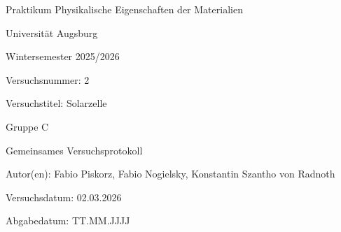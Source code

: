 \documentclass[11pt,a4paper]{article}
\numberwithin{equation}{section}
\newcommand{\Lehrveranstaltung}{Praktikum Physikalische Eigenschaften der Materialien}
\newcommand{\Universitaet}{Universität Augsburg}
\newcommand{\Semester}{Wintersemester 2025/2026}
\newcommand{\Versuchsnummer}{2}
\newcommand{\Versuchstitel}{Solarzelle}
\newcommand{\Gruppe}{C}
\newcommand{\Versuchsdatum}{02.03.2026}
\newcommand{\Abgabedatum}{TT.MM.JJJJ}
\newcommand{\Abgabeart}{Gemeinsames Versuchsprotokoll}
\newcommand{\Autor}{Fabio Piskorz, Fabio Nogielsky, Konstantin Szantho von Radnoth }
\begin{document}

\begin{titlepage}
    \centering
    {\Large \Lehrveranstaltung\par}
    \vspace{0.5cm}
    {\large \Universitaet\par}
    \vspace{0.5cm}
    {\large \Semester\par}
    \vspace{1.5cm}
    {\Large Versuchsnummer: \Versuchsnummer\par}
    \vspace{0.5cm}
    {\Large Versuchstitel: \Versuchstitel\par}
    \vspace{1.5cm}
    {\large Gruppe \Gruppe\par}
    \vspace{0.5cm}
    {\LARGE \Abgabeart\par}
    \vspace{0.5cm}
    {\large Autor(en): \Autor\par}
    \vspace{1.5cm}
    {\large Versuchsdatum: \Versuchsdatum\par}
    \vspace{0.5cm}
    {\large Abgabedatum: \Abgabedatum\par}

    \vfill
\end{titlepage}


\tableofcontents
\newpage

\end{document}
